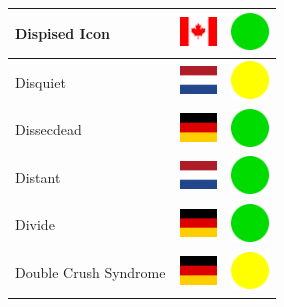 \documentclass[12pt, a4paper, twoside]{report}
\begin{document}
\begin{center}
\begin{longtable}{|p{5cm}|p{2cm}|p{2cm}|}
Dispised Icon & \includegraphics[width=1cm]{4x3/ca} & \includegraphics[width=1cm]{likes/y} \\ \hline
Disquiet & \includegraphics[width=1cm]{4x3/nl} & \includegraphics[width=1cm]{likes/m} \\ \hline
Dissecdead & \includegraphics[width=1cm]{4x3/de} & \includegraphics[width=1cm]{likes/y} \\ \hline
Distant & \includegraphics[width=1cm]{4x3/nl} & \includegraphics[width=1cm]{likes/y} \\ \hline
Divide & \includegraphics[width=1cm]{4x3/de} & \includegraphics[width=1cm]{likes/y} \\ \hline
Double Crush Syndrome & \includegraphics[width=1cm]{4x3/de} & \includegraphics[width=1cm]{likes/m} \\ \hline

\end{longtable}
\end{center}
\end{document}
